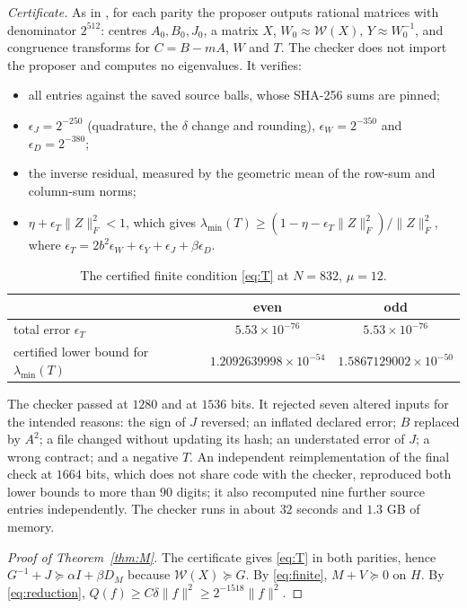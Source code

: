 \documentclass[11pt]{amsart}
\theoremstyle{remark}
\numberwithin{equation}{section}
\begin{document}
\emph{Certificate.} As in \cite[Section~6]{MoriVI}, for each parity the proposer outputs rational matrices with denominator $2^{512}$: centres $A_0,B_0,J_0$, a matrix $X$, $W_0\approx\mathcal W(X)$, $Y\approx W_0^{-1}$, and congruence transforms for $C=B-mA$, $W$ and $T$. The checker does not import the proposer and computes no eigenvalues. It verifies:
\begin{itemize}
\item all entries against the saved source balls, whose SHA-256 sums are pinned;
\item $\epsilon_J=2^{-250}$ (quadrature, the $\delta$ change and rounding), $\epsilon_W=2^{-350}$ and $\epsilon_D=2^{-380}$;
\item the inverse residual, measured by the geometric mean of the row-sum and column-sum norms;
\item $\eta+\epsilon_T\|Z\|_F^2<1$, which gives $\lambda_{\min}(T)\ge(1-\eta-\epsilon_T\|Z\|_F^2)/\|Z\|_F^2$, where $\epsilon_T=2b^2\epsilon_W+\epsilon_Y+\epsilon_J+\beta\epsilon_D$.
\end{itemize}

\begin{table}[h]
\centering\small
\begin{tabular}{lcc}
\toprule
& even & odd\\
\midrule
total error $\epsilon_T$ & $5.53\times10^{-76}$ & $5.53\times10^{-76}$\\
certified lower bound for $\lambda_{\min}(T)$ & $1.2092639998\times10^{-54}$ & $1.5867129002\times10^{-50}$\\
\bottomrule
\end{tabular}
\caption{The certified finite condition \eqref{eq:T} at $N=832$, $\mu=12$.}
\end{table}

The checker passed at $1280$ and at $1536$ bits. It rejected seven altered inputs for the intended reasons: the sign of $J$ reversed; an inflated declared error; $B$ replaced by $A^2$; a file changed without updating its hash; an understated error of $J$; a wrong contract; and a negative $T$. An independent reimplementation of the final check at $1664$ bits, which does not share code with the checker, reproduced both lower bounds to more than $90$ digits; it also recomputed nine further source entries independently. The checker runs in about $32$ seconds and $1.3$ GB of memory.

\begin{proof}[Proof of Theorem~\ref{thm:M}]
The certificate gives \eqref{eq:T} in both parities, hence $G^{-1}+J\succeq\alpha I+\beta D_M$ because $\mathcal W(X)\succeq G$. By \eqref{eq:finite}, $M+V\succeq0$ on $H$. By \eqref{eq:reduction}, $Q(f)\ge C\delta\|f\|^2\ge2^{-1518}\|f\|^2$.
\end{proof}
\end{document}
